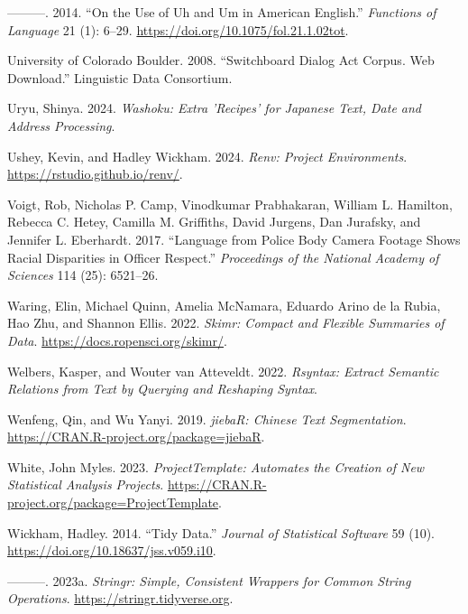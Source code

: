 \documentclass[
  letterpaper,
]{latex/krantz}
\newlength{\cslhangindent}
\newenvironment{CSLReferences}[2] %
 {\begin{list}{}{%
  \setlength{\itemindent}{0pt}
  \setlength{\leftmargin}{0pt}
  \setlength{\parsep}{0pt}
  \ifodd #1
   \setlength{\leftmargin}{\cslhangindent}
   \setlength{\itemindent}{-1\cslhangindent}
  \fi
  \setlength{\itemsep}{#2\baselineskip}}}
 {\end{list}}
\theoremstyle{definition}
\theoremstyle{remark}
\begin{document}
\begin{CSLReferences}{1}{0}
---------. 2014. {``On the Use of Uh and Um in American English.''}
\emph{Functions of Language} 21 (1): 6--29.
\url{https://doi.org/10.1075/fol.21.1.02tot}.

University of Colorado Boulder. 2008. {``Switchboard Dialog Act Corpus.
Web Download.''} Linguistic Data Consortium.

Uryu, Shinya. 2024. \emph{Washoku: Extra 'Recipes' for Japanese Text,
Date and Address Processing}.

Ushey, Kevin, and Hadley Wickham. 2024. \emph{Renv: Project
Environments}. \url{https://rstudio.github.io/renv/}.

Voigt, Rob, Nicholas P. Camp, Vinodkumar Prabhakaran, William L.
Hamilton, Rebecca C. Hetey, Camilla M. Griffiths, David Jurgens, Dan
Jurafsky, and Jennifer L. Eberhardt. 2017. {``Language from Police Body
Camera Footage Shows Racial Disparities in Officer Respect.''}
\emph{Proceedings of the National Academy of Sciences} 114 (25):
6521--26.

Waring, Elin, Michael Quinn, Amelia McNamara, Eduardo Arino de la Rubia,
Hao Zhu, and Shannon Ellis. 2022. \emph{Skimr: Compact and Flexible
Summaries of Data}. \url{https://docs.ropensci.org/skimr/}.

Welbers, Kasper, and Wouter van Atteveldt. 2022. \emph{Rsyntax: Extract
Semantic Relations from Text by Querying and Reshaping Syntax}.

Wenfeng, Qin, and Wu Yanyi. 2019. \emph{jiebaR: Chinese Text
Segmentation}. \url{https://CRAN.R-project.org/package=jiebaR}.

White, John Myles. 2023. \emph{ProjectTemplate: Automates the Creation
of New Statistical Analysis Projects}.
\url{https://CRAN.R-project.org/package=ProjectTemplate}.

Wickham, Hadley. 2014. {``Tidy Data.''} \emph{Journal of Statistical
Software} 59 (10). \url{https://doi.org/10.18637/jss.v059.i10}.

---------. 2023a. \emph{Stringr: Simple, Consistent Wrappers for Common
String Operations}. \url{https://stringr.tidyverse.org}.


\end{CSLReferences}
\end{document}
